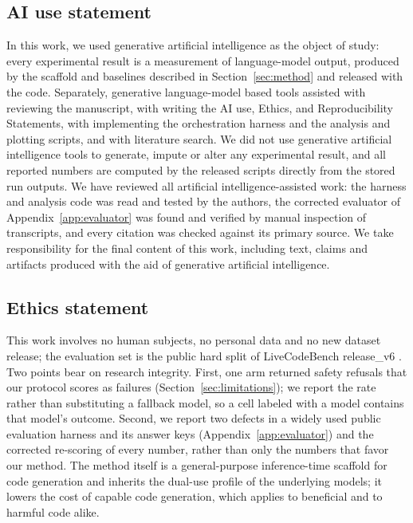 \documentclass{article}
\begin{document}
\subsection*{AI use statement}

In this work, we used generative artificial intelligence as the object of study: every experimental result is a
measurement of language-model output, produced by the scaffold and baselines described in
Section~\ref{sec:method} and released with the code. Separately, generative language-model based tools assisted
with reviewing the manuscript, with writing the AI use, Ethics, and Reproducibility Statements, with implementing the orchestration harness and the
analysis and plotting scripts, and with literature search. We did not use generative artificial intelligence tools to
generate, impute or alter any experimental result, and all reported numbers are computed by the
released scripts directly from the stored run outputs. We have reviewed all artificial intelligence-assisted work: the
harness and analysis code was read and tested by the authors, the corrected evaluator of
Appendix~\ref{app:evaluator} was found and verified by manual inspection of transcripts, and every
citation was checked against its primary source. We take responsibility for the final content of
this work, including text, claims and artifacts produced with the aid of generative artificial intelligence.

\subsection*{Ethics statement}

This work involves no human subjects, no personal data and no new dataset release; the evaluation
set is the public hard split of LiveCodeBench release\_v6 \citep{jain2024}. Two points bear
on research integrity. First, one arm returned safety refusals that our protocol scores as
failures (Section~\ref{sec:limitations}); we report the rate rather than substituting a fallback
model, so a cell labeled with a model contains that model's outcome. Second, we report two defects in
a widely used public evaluation harness and its answer keys (Appendix~\ref{app:evaluator}) and the
corrected re-scoring of every number, rather than only the numbers that favor our method. The method itself
is a general-purpose inference-time scaffold for code generation and inherits the dual-use profile
of the underlying models; it lowers the cost of capable code generation, which applies to
beneficial and to harmful code alike.
\end{document}
